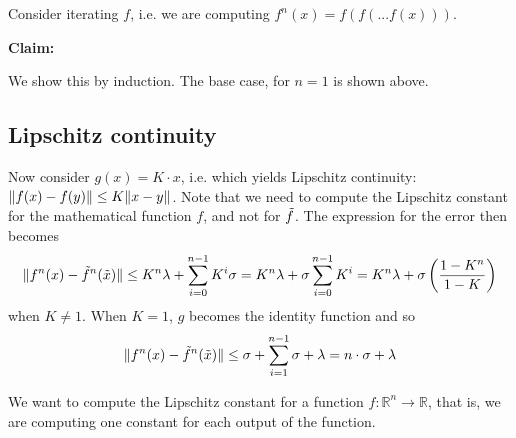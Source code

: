 

Consider iterating $f$, i.e. we are computing $f^n(x) = f(f(...f(x)))$.

{\bf Claim: }

We show this by induction. The base case, for $n = 1$ is shown above.



\subsection{Lipschitz continuity}
Now consider $g(x) = K \cdot x$, i.e. which yields Lipschitz continuity:
$\lVert f(x) - f(y) \rVert \le K \lVert x - y \rVert$.
Note that we need to compute the Lipschitz constant for the mathematical function $f$,
and not for $\tilde{f}$.
The expression for the error then becomes
\begin{align}
\lVert f^n(x) - \tilde{f}^n(\tilde{x})\rVert \le K^n \lambda + \sum^{n-1}_{i=0}K^i \sigma
  = K^n \lambda + \sigma \sum^{n-1}_{i=0} K^i
  = K^n \lambda + \sigma \left(\dfrac{1 - K^n}{1-K} \right)
\end{align}
when $K \ne 1$.
When $K = 1$, $g$ becomes the identity function and so
\begin{align}
\lVert f^n(x) - \tilde{f}^n(\tilde{x})\rVert \le \sigma + \sum^{n-1}_{i=1}\sigma + \lambda
= n \cdot \sigma + \lambda
\end{align}

We want to compute the Lipschitz constant for a function $f: \mathbb{R}^n \to \mathbb{R}$,
that is, we are computing one constant for each output of the function.

